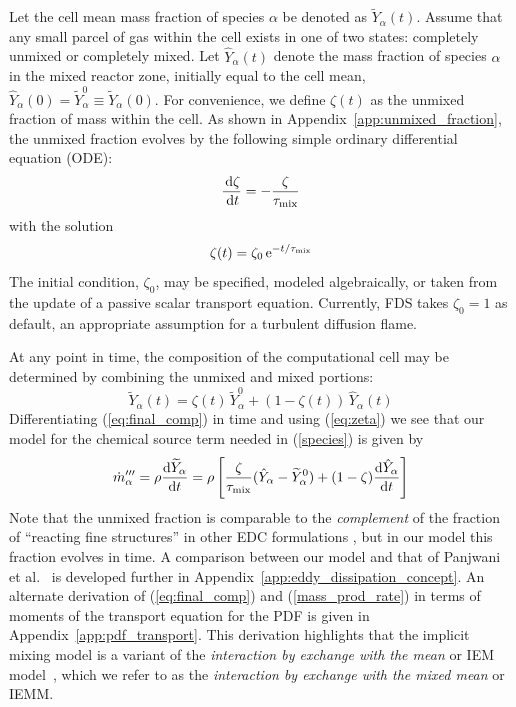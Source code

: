 Let the cell mean mass fraction of species $\alpha$ be denoted as $\widetilde{Y}_\alpha(t)$. Assume that any small parcel of gas within the cell exists in one of two states: completely unmixed or completely mixed.  Let $\hat{Y}_\alpha(t)$ denote the mass fraction of species $\alpha$ in the mixed reactor zone, initially equal to the cell mean, $\hat{Y}_\alpha(0) = \widetilde{Y}_{\alpha}^0 \equiv \widetilde{Y}_{\alpha}(0)$. For convenience, we define $\zeta(t)$ as the unmixed fraction of mass within the cell. As shown in Appendix~\ref{app:unmixed_fraction}, the unmixed fraction evolves by the following simple ordinary differential equation (ODE):
\begin{equation}
\label{eq:zeta}
\frac{\,\mathrm{d} \zeta}{\,\mathrm{d} t}=-\frac{\zeta}{\tau_{\rm mix}}
\end{equation}
with the solution
\begin{equation}
\label{eq:zeta_soln}
\zeta(t) = \zeta_0 \,{\rm e}^{-t/\tau_{\rm mix}}
\end{equation}
The initial condition, $\zeta_0$, may be specified, modeled algebraically, or taken from the update of a passive scalar transport equation.  Currently, FDS takes $\zeta_0=1$ as default, an appropriate assumption for a turbulent diffusion flame.

At any point in time, the composition of the computational cell may be determined by combining the unmixed and mixed portions:
\begin{equation}
\label{eq:final_comp}
\widetilde{Y}_{\alpha}(t)= \zeta(t) \, \widetilde{Y}_{\alpha}^0 + (1-\zeta(t)) \, \hat{Y}_{\alpha}(t)
\end{equation}
Differentiating (\ref{eq:final_comp}) in time and using (\ref{eq:zeta}) we see that our model for the chemical source term needed in (\ref{species}) is given by
\begin{equation}
\label{mass_prod_rate}
\dot{m}^{\prime\prime\prime}_{\alpha} = \rho \frac{\mbox{d}\widetilde{Y}_{\alpha}}{\mbox{d}t}
= \rho \left[ \frac{\zeta}{\tau_{\rm{mix}}} (\hat{Y}_\alpha - \widetilde{Y}_{\alpha}^0)  + (1-\zeta) \frac{\mbox{d}\hat{Y}_\alpha}{\mbox{d}t} \right]
\end{equation}
Note that the unmixed fraction is comparable to the \emph{complement} of the fraction of ``reacting fine structures'' in other EDC formulations \cite{Chen:1,Panjwani:2010}, but in our model this fraction evolves in time.  A comparison between our model and that of Panjwani et al.~\cite{Panjwani:2010} is developed further in Appendix~\ref{app:eddy_dissipation_concept}. An alternate derivation of (\ref{eq:final_comp}) and (\ref{mass_prod_rate}) in terms of moments of the transport equation for the PDF is given in Appendix~\ref{app:pdf_transport}.  This derivation highlights that the implicit mixing model is a variant of the {\em interaction by exchange with the mean} or IEM model~\cite{Dopazo:1974}, which we refer to as the {\em interaction by exchange with the mixed mean} or IEMM.

